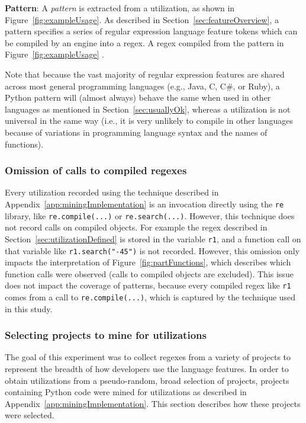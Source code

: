 \noindent \textbf{Pattern}: A \emph{pattern} is extracted from a utilization, as shown in Figure~\ref{fig:exampleUsage}. As described in Section~\ref{sec:featureOverview}, a pattern specifies a series of regular expression language feature tokens which can be compiled by an engine into a regex.  A regex compiled from the pattern in Figure~\ref{fig:exampleUsage} .

Note that because the vast majority of regular expression features are shared across most general programming languages (e.g., Java, C, C\#, or Ruby), a Python pattern will (almost always) behave the same when used in other languages as mentioned in Section~\ref{sec:usuallyOk}, whereas a utilization is not universal in the same way (i.e., it is very unlikely to compile in other languages because of variations in programming language syntax and the names of functions).

\subsubsection{Omission of calls to compiled regexes}
Every utilization recorded using the technique described in Appendix~\ref{app:miningImplementation} is an invocation directly using the {\tt re} library, like {\tt re.compile(...)} or {\tt re.search(...)}.  However, this technique does not record calls on compiled objects.  For example the regex described in Section~\ref{sec:utilizationDefined} is stored in the variable {\tt r1}, and a function call on that variable like {\tt r1.search("-45")} is not recorded.  However, this omission only impacts the interpretation of Figure~\ref{fig:partFunctions}, which describes which function calls were observed (calls to compiled objects are excluded).  This issue does not impact the coverage of patterns, because every compiled regex like {\tt r1} comes from a call to {\tt re.compile(...)}, which is captured by the technique used in this study.

\subsubsection{Selecting projects to mine for utilizations}
\label{sec:selectingProjects}

The goal of this experiment was to collect regexes from a variety of projects to represent the breadth of how developers use the language features.  In order to obtain utilizations from a pseudo-random, broad selection of projects,  projects containing Python code were mined for utilizations as described in Appendix~\ref{app:miningImplementation}.  This section describes how these projects were selected.

